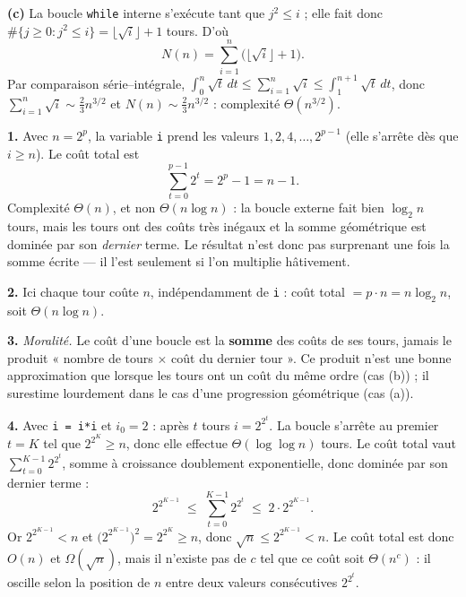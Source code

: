 \documentclass[11pt,a4paper]{article}
\begin{document}
\textbf{(c)} La boucle \texttt{while} interne s'exécute tant que $j^2\le i$ ; elle fait
donc $\#\{j\ge 0 : j^2\le i\} = \lfloor\sqrt i\rfloor + 1$ tours. D'où
\[
  N(n)=\sum_{i=1}^{n}\big(\lfloor\sqrt i\rfloor+1\big).
\]
Par comparaison série–intégrale, $\displaystyle\int_0^{n}\!\sqrt t\,dt \le
\sum_{i=1}^n \sqrt i \le \int_1^{n+1}\!\sqrt t\,dt$, donc
$\sum_{i=1}^n\sqrt i \sim \frac23 n^{3/2}$ et
$N(n)\sim \frac23 n^{3/2}$ : complexité $\Theta\!\left(n^{3/2}\right)$.

\reponse
\textbf{1.} Avec $n=2^p$, la variable \texttt{i} prend les valeurs
$1,2,4,\dots,2^{p-1}$ (elle s'arrête dès que $i\ge n$). Le coût total est
\[
  \sum_{t=0}^{p-1} 2^{t} = 2^{p}-1 = n-1 .
\]
Complexité $\Theta(n)$, et non $\Theta(n\log n)$ : la boucle externe fait bien
$\log_2 n$ tours, mais les tours ont des coûts très inégaux et la somme géométrique est
dominée par son \emph{dernier} terme. Le résultat n'est donc pas surprenant une fois
la somme écrite --- il l'est seulement si l'on multiplie hâtivement.

\textbf{2.} Ici chaque tour coûte $n$, indépendamment de \texttt{i} :
coût total $= p\cdot n = n\log_2 n$, soit $\Theta(n\log n)$.

\textbf{3.} \emph{Moralité.} Le coût d'une boucle est la \textbf{somme} des coûts de ses
tours, jamais le produit « nombre de tours $\times$ coût du dernier tour ». Ce produit
n'est une bonne approximation que lorsque les tours ont un coût du même ordre (cas (b)) ;
il surestime lourdement dans le cas d'une progression géométrique (cas (a)).

\textbf{4.} Avec \texttt{i = i*i} et $i_0=2$ : après $t$ tours $i = 2^{2^{t}}$.
La boucle s'arrête au premier $t=K$ tel que $2^{2^{K}}\ge n$, donc elle effectue
$\Theta(\log\log n)$ tours. Le coût total vaut
$\displaystyle\sum_{t=0}^{K-1} 2^{2^{t}}$, somme à croissance doublement exponentielle,
donc dominée par son dernier terme :
\[
  2^{2^{K-1}} \;\le\; \sum_{t=0}^{K-1} 2^{2^{t}} \;\le\; 2\cdot 2^{2^{K-1}} .
\]
Or $2^{2^{K-1}} < n$ et $\big(2^{2^{K-1}}\big)^2 = 2^{2^{K}}\ge n$, donc
$\sqrt n \le 2^{2^{K-1}} < n$. Le coût total est donc $O(n)$ et $\Omega(\sqrt n)$,
mais il n'existe pas de $c$ tel que ce coût soit $\Theta(n^{c})$ : il oscille selon la
position de $n$ entre deux valeurs consécutives $2^{2^{t}}$.

\end{document}
